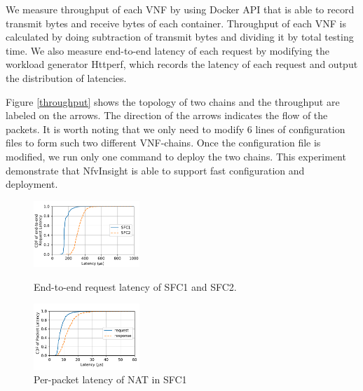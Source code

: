 
We measure throughput of each VNF by using Docker API that
is able to record transmit bytes and receive bytes of each container. 
Throughput of each VNF is calculated
by doing subtraction of transmit bytes and dividing it by total testing time.
We also measure end-to-end latency of each request by modifying the workload generator Httperf,
which records the latency of each request and output the distribution of latencies.

Figure \ref{throughput} shows the topology of two chains
and the throughput are labeled on the arrows.
The direction of the arrows indicates the flow of the packets.
It is worth noting that 
we only need to modify 6 lines of configuration files
to form such two different VNF-chains. Once the configuration 
file is modified, we run only one command to deploy the two chains. 
This experiment demonstrate that NfvInsight is able to support 
fast configuration and deployment.





\begin{figure}
  \begin{minipage}[t]{0.47\columnwidth}
    \centering
    \includegraphics[width=4.0cm]{fig/e2e_latency_chain12.pdf}

    \caption{\small{End-to-end request latency of SFC1 and SFC2.}}
    \label{e2e_latency}
  \end{minipage}%
  \hfill
  \hfill
  \begin{minipage}[t]{0.47\columnwidth}
    \centering
    \includegraphics[width=4.0cm]{fig/cdf_chain1.pdf}
    \caption{\small{Per-packet latency of NAT in SFC1}}
    \label{nat_latency}
  \end{minipage}

\end{figure}

